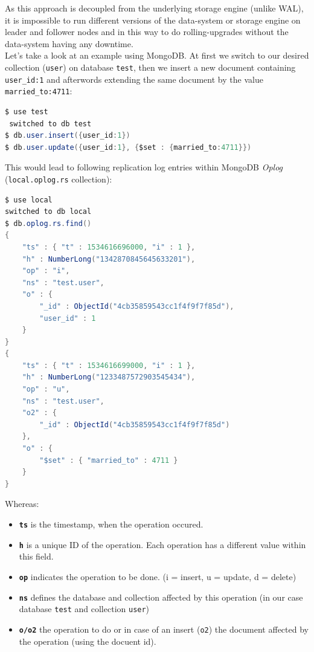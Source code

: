 {As this approach is decoupled from the underlying storage engine (unlike WAL), it is impossible to run different versions of the data-system or storage engine on leader and follower nodes and in this way to do rolling-upgrades without the data-system having any downtime.\\

Let's take a look at an example using MongoDB. At first we switch to our desired collection (\lstinline{user}) on database \lstinline{test}, then we insert a new document containing \lstinline{user_id:1} and afterwords extending the same document by the value \lstinline{married_to:4711}:

\begin{lstlisting}[aboveskip=2ex, belowskip=2ex,emphstyle=\underbar, breaklines=true,frame=none,numbers=none,xleftmargin=0.01\textwidth,xrightmargin=0.01\textwidth,showstringspaces=false,language=java]
$ use test
 switched to db test
$ db.user.insert({user_id:1})
$ db.user.update({user_id:1}, {$set : {married_to:4711}})
\end{lstlisting}

This would lead to following replication log entries within MongoDB \textit{Oplog} (\lstinline{local.oplog.rs} collection):
\begin{lstlisting}[aboveskip=2ex, belowskip=2ex,emphstyle=\underbar, breaklines=true,frame=none,numbers=none,xleftmargin=0.01\textwidth,xrightmargin=0.01\textwidth,showstringspaces=false,language=java]
$ use local
switched to db local
$ db.oplog.rs.find()
{ 	
	"ts" : { "t" : 1534616696000, "i" : 1 }, 
	"h" : NumberLong("1342870845645633201"), 
	"op" : "i", 
	"ns" : "test.user", 
	"o" : { 
		"_id" : ObjectId("4cb35859543cc1f4f9f7f85d"), 
		"user_id" : 1 
	} 
}
{ 	
	"ts" : { "t" : 1534616699000, "i" : 1 }, 
	"h" : NumberLong("1233487572903545434"), 
	"op" : "u", 
	"ns" : "test.user", 
	"o2" : {
	 	"_id" : ObjectId("4cb35859543cc1f4f9f7f85d") 
	}, 
  	"o" : { 
  		"$set" : { "married_to" : 4711 } 
  	} 
}
\end{lstlisting}

Whereas: 
\begin{itemize}
\item \textbf{\lstinline{ts}} is the timestamp, when the operation occured.
\item \textbf{\lstinline{h}} is a unique ID of the operation. Each operation has a different value within this field.
\item \textbf{\lstinline{op}} indicates the operation to be done. (i = insert, u = update, d = delete)
\item \textbf{\lstinline{ns}} defines the database and collection affected by this operation (in our case database \lstinline{test} and collection \lstinline{user})
\item \textbf{\lstinline{o/o2}} the operation to do or in case of an insert (\lstinline{o2}) the document affected by the operation (using the docuent id).\\
\end{itemize}

}
